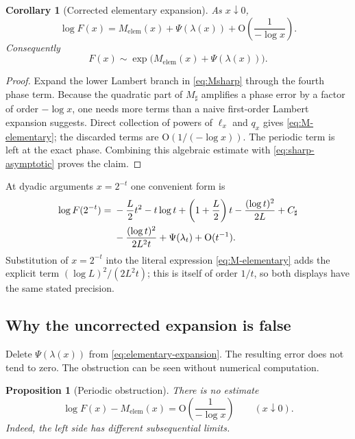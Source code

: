 \documentclass[11pt]{article}
\numberwithin{equation}{section}
\newtheorem{proposition}[theorem]{Proposition}
\newtheorem{corollary}[theorem]{Corollary}
\theoremstyle{definition}
\theoremstyle{remark}
\newcommand{\Oh}{\mathrm O}
\begin{document}
\begin{corollary}[Corrected elementary expansion]\label{cor:elementary-expansion}
As $x\downarrow0$,
\begin{equation}\label{eq:elementary-expansion}
\boxed{
 \log F(x)=M_{\mathrm{elem}}(x)+\Psi(\lambda(x))
 +\Oh\!\left(\frac1{-\log x}\right).}
\end{equation}
Consequently
\begin{equation}\label{eq:elementary-F-equivalent}
 F(x)\sim
 \exp\!\bigl(M_{\mathrm{elem}}(x)+\Psi(\lambda(x))\bigr).
\end{equation}
\end{corollary}

\begin{proof}
Expand the lower Lambert branch in \eqref{eq:Msharp} through the fourth phase
term.  Because the quadratic part of $M_\sharp$ amplifies a phase error by a
factor of order $-\log x$, one needs more terms than a naive first-order
Lambert expansion suggests.  Direct collection of powers of $\ell_x$ and
$q_x$ gives \eqref{eq:M-elementary}; the discarded terms are
$\Oh(1/(-\log x))$.  The periodic term is left at the exact phase.  Combining
this algebraic estimate with \eqref{eq:sharp-asymptotic} proves the claim.
\end{proof}

At dyadic arguments $x=2^{-t}$ one convenient form is
\begin{align}
 \log F(2^{-t})={}&-\frac L2t^2-t\log t
 +\left(1+\frac L2\right)t
 -\frac{(\log t)^2}{2L}+C_\sharp
 \notag\\
 &-\frac{(\log t)^2}{2L^2t}
 +\Psi(\lambda_t)+\Oh(t^{-1}).
 \label{eq:dyadic-explicit-asymptotic}
\end{align}
Substitution of $x=2^{-t}$ into the literal expression
\eqref{eq:M-elementary} adds the explicit term
$(\log L)^2/(2L^2t)$; this is itself of order $1/t$, so both displays have the
same stated precision.

\subsection{Why the uncorrected expansion is false}

Delete $\Psi(\lambda(x))$ from \eqref{eq:elementary-expansion}.  The resulting
error does not tend to zero.  The obstruction can be seen without numerical
computation.

\begin{proposition}[Periodic obstruction]\label{prop:periodic-obstruction}
There is no estimate
\begin{equation}\label{eq:false-uncorrected}
 \log F(x)-M_{\mathrm{elem}}(x)
 =\Oh\!\left(\frac1{-\log x}\right)
 \qquad(x\downarrow0).
\end{equation}
Indeed, the left side has different subsequential limits.
\end{proposition}
\end{document}
